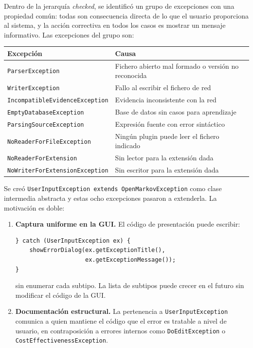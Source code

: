 \documentclass[12pt,a4paper]{article}
\begin{document}
Dentro de la jerarquía \emph{checked}, se identificó un grupo de excepciones con
una propiedad común: todas son consecuencia directa de lo que el usuario
proporciona al sistema, y la acción correctiva en todos los casos es mostrar un
mensaje informativo. Las excepciones del grupo son:

\begin{center}
\begin{tabular}{ll}
\toprule
Excepción & Causa \\
\midrule
\texttt{ParserException}               & Fichero abierto mal formado o versión no reconocida \\
\texttt{WriterException}               & Fallo al escribir el fichero de red \\
\texttt{IncompatibleEvidenceException} & Evidencia inconsistente con la red \\
\texttt{EmptyDatabaseException}        & Base de datos sin casos para aprendizaje \\
\texttt{ParsingSourceException}        & Expresión fuente con error sintáctico \\
\texttt{NoReaderForFileException}      & Ningún plugin puede leer el fichero indicado \\
\texttt{NoReaderForExtension}          & Sin lector para la extensión dada \\
\texttt{NoWriterForExtensionException} & Sin escritor para la extensión dada \\
\bottomrule
\end{tabular}
\end{center}

Se creó \texttt{UserInputException extends OpenMarkovException} como clase
intermedia abstracta y estas ocho excepciones pasaron a extenderla. La
motivación es doble:

\begin{enumerate}
  \item \textbf{Captura uniforme en la GUI.} El código de presentación puede
    escribir:
    \begin{lstlisting}[caption={Captura uniforme de errores de usuario}]
} catch (UserInputException ex) {
    showErrorDialog(ex.getExceptionTitle(),
                    ex.getExceptionMessage());
}
    \end{lstlisting}
    sin enumerar cada subtipo. La lista de subtipos puede crecer en el futuro
    sin modificar el código de la GUI.

  \item \textbf{Documentación estructural.} La pertenencia a
    \texttt{UserInputException} comunica a quien mantiene el código que el
    error es tratable a nivel de usuario, en contraposición a errores internos
    como \texttt{DoEditException} o \texttt{CostEffectivenessException}.
\end{enumerate}
\end{document}
